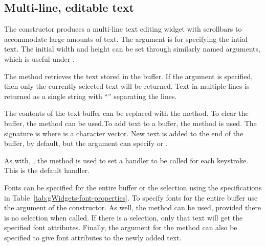 \subsection{Multi-line, editable text}
\label{sec:gWidgets-multi-line-editable}

The  constructor produces a multi-line text editing
widget with scrollbars to accommodate large amounts of text. The
 argument is for specifying the intial
text. The initial width and height can be
set through similarly named arguments, which is useful under
. 

The  method retrieves the text stored in the
buffer. If the argument  is specified, then only the
currently selected text will be returned. Text in multiple lines is
returned as a single string with ``\backslashn'' separating the lines.

The contents of the text buffer can be replaced with the
 method. To clear the buffer, the
 method can be used.To add text to a buffer, the
 method is used. The signature is
 where  is a character vector. New text
is added to the end of the buffer, by default, but the
 argument can specify  or .

As with, , the  method is used
to set a handler to be called for each keystroke. This is the default handler.

Fonts can be specified for the entire buffer or the selection using
the specifications in Table~\ref{tab:gWidgets-font-properties}. To
specify fonts for the entire buffer use the
 argument of the constructor. As well, the
 method can be used, provided there is no
selection when called. If there is a selection, only that text will get the specified
font attributes. Finally, the  argument
for the  method can also be specified to give font
attributes to the newly added text.

